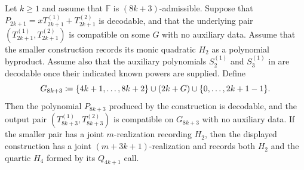 \begin{lemma}\label{lem:8k+3-splittable}
    Let $k\ge1$ and assume that $\mathbb{F}$ is $(8k+3)$-admissible.
    Suppose that $P_{2k+1}=xT^{(1)}_{2k+1}+T^{(2)}_{2k+1}$ is decodable,
    and that the underlying pair
    $(T^{(1)}_{2k+1},T^{(2)}_{2k+1})$ is compatible on some $G$ with no
    auxiliary data.  Assume that the smaller construction records its monic
    quadratic $H_2$ as a polynomial byproduct.  Assume also that the auxiliary polynomials
    $S^{(1)}_2$ and $S^{(1)}_3$ in  are decodable once
    their indicated known powers are supplied.
    Define
    \[
      G_{8k+3}\coloneqq
      \{4k+1,\ldots,8k+2\}\cup (2k+G)\cup \{0,\dotsc,2k+1-1\}.
    \]
    Then the polynomial $P_{8k+3}$ produced by the construction is decodable,
    and the output pair $(T^{(1)}_{8k+3},T^{(2)}_{8k+3})$ is compatible on
    $G_{8k+3}$ with no auxiliary data.  If the smaller pair has a joint
    $m$-realization recording $H_2$, then the displayed construction has a
    joint $(m+3k+1)$-realization and records both $H_2$ and the quartic $H_4$
    formed by its $Q_{4k+1}$ call.
\end{lemma}
